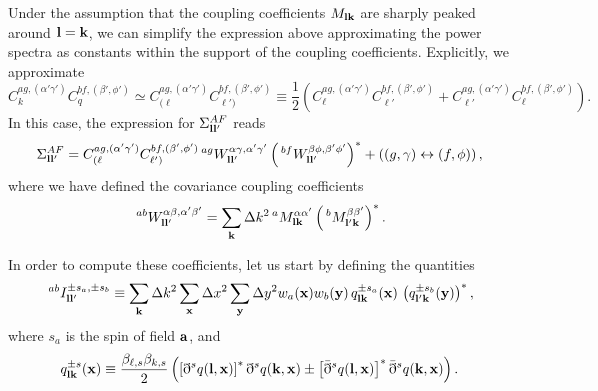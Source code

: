 \documentclass[a4paper,11pt]{article}
\newcommand{\summ}[1]{\sum_{\bf #1}\Delta #1^2}
\begin{document}
    Under the assumption that the coupling coefficients $M_{{\bf l}{\bf k}}$ are sharply peaked around ${\bf l}={\bf k}$, we can simplify the expression above approximating the power spectra as constants within the support of the coupling coefficients. Explicitly, we approximate 
    \begin{equation}\nonumber
     C^{ag,(\alpha'\gamma')}_kC^{bf,(\beta',\phi')}_q\simeq C^{ag,(\alpha'\gamma')}_{(\ell}C^{bf,(\beta',\phi')}_{\ell')}\equiv\frac{1}{2}\left(C^{ag,(\alpha'\gamma')}_\ell C^{bf,(\beta',\phi')}_{\ell'}+C^{ag,(\alpha'\gamma')}_{\ell'} C^{bf,(\beta',\phi')}_\ell\right).
    \end{equation}
    In this case, the expression for $\Sigma^{AF}_{{\bf l}{\bf l}'}$ reads
    \begin{align}
      \Sigma^{AF}_{{\bf l}{\bf l}'}=C^{ag,(\alpha'\gamma')}_{(\ell}C^{bf,(\beta',\phi')}_{\ell')}\,^{ag}W^{\alpha\gamma,\alpha'\gamma'}_{{\bf l}{\bf l}'}\left(\,^{bf}W^{\beta\phi,\beta'\phi'}_{{\bf l}{\bf l}'}\right)^*+\left((g,\gamma)\leftrightarrow(f,\phi)\right),
    \end{align}
    where we have defined the covariance coupling coefficients
    \begin{equation}
      \,^{ab}W^{\alpha\beta,\alpha'\beta'}_{{\bf l}{\bf l}'}=\summ{k}\,^aM^{\alpha\alpha'}_{{\bf l}{\bf k}}\left(\,^bM^{\beta\beta'}_{{\bf l}'{\bf k}}\right)^*.
    \end{equation}

    In order to compute these coefficients, let us start by defining the quantities
    \begin{equation}
      \,^{ab}I^{\pm s_a,\pm s_b}_{{\bf l}{\bf l'}}\equiv\summ{k}\summ{x}\summ{y}w_a({\bf x})w_b({\bf y})\,q^{\pm s_a}_{{\bf l}{\bf k}}({\bf x})\,\left(q^{\pm s_b}_{{\bf l}'{\bf k}}({\bf y})\right)^*,
    \end{equation}
    where $s_a$ is the spin of field ${\bf a}$, and
    \begin{equation}
      q^{\pm s}_{{\bf l}{\bf k}}({\bf x})\equiv \frac{\beta_{\ell,s}\beta_{k,s}}{2}\left(\left[\eth^s q({\bf l},{\bf x})\right]^* \eth^sq({\bf k},{\bf x})\pm\left[\bar{\eth}^sq({\bf l},{\bf x})\right]^*\bar{\eth}^sq({\bf k},{\bf x})\right).
    \end{equation}
\end{document}
